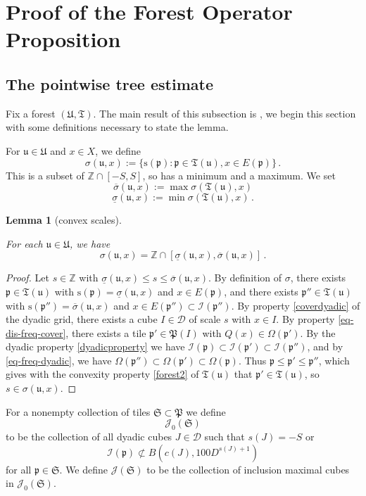 \documentclass[10pt,a4paper]{article}
\theoremstyle{plain}
\newtheorem{lemma}[theorem]{Lemma}
\theoremstyle{definition}
\numberwithin{equation}{subsection}
\newcommand{\fp}{{\mathfrak p}}
\newcommand{\fP}{{\mathfrak P}}
\newcommand{\fu}{{\mathfrak u}}
\newcommand{\fU}{{\mathfrak U}}
\newcommand{\fT}{{\mathfrak T}}
\newcommand{\ps}{{\mathrm{s}}}
\newcommand{\fc}{{\Omega}}
\newcommand{\scI}{{\mathcal{I}}} %
\newcommand{\tQ}{{Q}}
\newcommand{\lean}[1]{}
\newcommand{\leanok}{}
\begin{document}
\section{Proof of the Forest Operator Proposition}

\label{treesection}

\subsection{The pointwise tree estimate}
Fix a forest $(\fU, \fT)$. The main result of this subsection is , we begin this section with some definitions necessary to state the lemma.

For $\fu \in \fU$ and $x\in X$, we define
$$
    \sigma (\fu, x):=\{\ps(\fp):\fp\in \fT(\fu), x\in E(\fp)\}\,.
$$
This is a subset of $\mathbb{Z} \cap [-S, S]$, so has a minimum and a maximum. We set
$$
    \overline{\sigma} (\fu, x) := \max \sigma(\fT(\fu), x)
$$
$$
    \underline{\sigma} (\fu, x) := \min\sigma(\fT(\fu), x)\,.
$$
\begin{lemma}[convex scales]
\label{convex-scales}
\leanok
\lean{TileStructure.Forest.convex_scales}
    For each $\fu \in \fU$, we have
    $$
        \sigma(\fu, x) = \mathbb{Z} \cap [\underline{\sigma} (\fu, x), \overline{\sigma} (\fu, x)]\,.
    $$
\end{lemma}

\begin{proof}
    \leanok
    Let $s \in \mathbb{Z}$ with $\underline{\sigma} (\fu, x) \le s \le \overline{\sigma} (\fu, x)$. By definition of $\sigma$, there exists $\fp \in \fT(\fu)$ with $\ps(\fp) = \underline{\sigma} (\fu, x)$ and $x \in E(\fp)$, and there exists $\fp'' \in \fT(\fu)$ with $\ps(\fp'') = \overline{\sigma} (\fu, x)$ and $x \in E(\fp'') \subset \scI(\fp'')$. By property \eqref{coverdyadic} of the dyadic grid, there exists a cube $I \in \mathcal{D}$ of scale $s$ with $x \in I$. By property \eqref{eq-dis-freq-cover}, there exists a tile $\fp' \in \fP(I)$ with $\tQ(x) \in \fc(\fp')$. By the dyadic property \eqref{dyadicproperty} we have $\scI(\fp) \subset \scI(\fp') \subset \scI(\fp'')$, and by \eqref{eq-freq-dyadic}, we have $\fc(\fp'') \subset \fc(\fp') \subset \fc(\fp)$. Thus $\fp \le \fp' \le\fp''$, which gives with the convexity property \eqref{forest2} of $\fT(\fu)$ that $\fp' \in \fT(\fu)$, so $s \in \sigma(\fu, x)$.
\end{proof}

For a nonempty collection of tiles $\mathfrak{S} \subset \fP$ we define
$$
    \mathcal{J}_0(\mathfrak{S})
$$
to be the collection of all dyadic cubes $J \in \mathcal{D}$ such that $s(J) = -S$ or
$$
    \scI(\fp) \not\subset B(c(J), 100D^{s(J) + 1})
$$
for all $\fp \in \mathfrak{S}$. We define $\mathcal{J}(\mathfrak{S})$ to be the collection of inclusion maximal cubes in $\mathcal{J}_0(\mathfrak{S})$.
\end{document}
